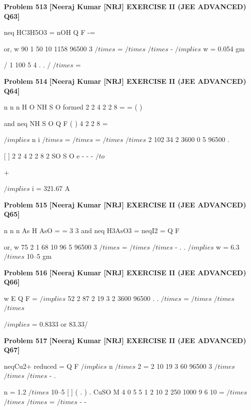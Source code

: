 \begin{problembox}
\textbf{Problem 513} \hfill \textbf{[Neeraj Kumar [NRJ] EXERCISE II (JEE ADVANCED) Q63]}
\label{q:ext-nrj_all_questions-513}

neq HC3H5O3 = nOH
Q
F
-=
 
 or, w
90
1
50
10
1158
96500
3
$/times$ =
$/times$
$/times$
-
 $/implies$ w = 0.054 gm
 
   /%
1
100
5 4
.
. /%
$/times$
=
\end{problembox}

\begin{problembox}
\textbf{Problem 514} \hfill \textbf{[Neeraj Kumar [NRJ] EXERCISE II (JEE ADVANCED) Q64]}
\label{q:ext-nrj_all_questions-514}

n
n
n
H O
NH
S O
formed
2
2
4 2
2
8
=
=
(
)
 
 and neq NH
S O
Q
F
(
)
4 2
2
8 =
 
 
 $/implies$ n
i
$/times$
=
$/times$
=
$/times$
$/times$
2
102
34
2
3600
0 5
96500
.
 
 
 
[
]
2
2
4
2
2
8
2
SO
S O
e
-
-
-
 $/to$
 
+
  
$/implies$ i = 321.67 A
\end{problembox}

\begin{problembox}
\textbf{Problem 515} \hfill \textbf{[Neeraj Kumar [NRJ] EXERCISE II (JEE ADVANCED) Q65]}
\label{q:ext-nrj_all_questions-515}

n
n
n
As
H AsO
=
=
3
3
 and neq H3AsO3 = neqI2 = Q
F
 
 or, w
75
2
1 68 10
96 5
96500
3
$/times$
=
$/times$
$/times$
-
.
. $/implies$ w = 6.3 $/times$ 10--5 gm
\end{problembox}

\begin{problembox}
\textbf{Problem 516} \hfill \textbf{[Neeraj Kumar [NRJ] EXERCISE II (JEE ADVANCED) Q66]}
\label{q:ext-nrj_all_questions-516}

w
E
Q
F
=
 $/implies$ 52 2
87
2
19 3
2
3600
96500
.
.
$/times$
=
$/times$
$/times$
$/times$  
 
 $/implies$   = 0.8333 or 83.33/%
\end{problembox}

\begin{problembox}
\textbf{Problem 517} \hfill \textbf{[Neeraj Kumar [NRJ] EXERCISE II (JEE ADVANCED) Q67]}
\label{q:ext-nrj_all_questions-517}

neqCu2+ reduced = Q
F $/implies$ n $/times$ 2 = 2
10
19 3
60
96500
3
$/times$
$/times$
$/times$
-
.
 
   n = 1.2 $/times$ 10--5
  [
]
( .
)
.
CuSO
M
4 0
5
5
1 2
10
2
250
1000
9 6
10
=
$/times$
$/times$
$/times$
=
$/times$
-
-
\end{problembox}

